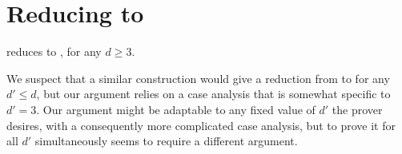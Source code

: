 \documentclass[11pt]{article}
\begin{document}
\appendix

\section{Reducing \CubicFormlong to \DFormlong} \label{app:cubic}

\begin{proposition} \label{prop:cubic_to_d}
\CubicFormlong reduces to \DFormlong, for any $d \geq 3$.
\end{proposition}

We suspect that a similar construction would give a reduction from 
 to \DFormlong for any $d' \leq d$, but our 
argument relies on a case analysis that is somewhat specific to $d'=3$. Our 
argument might be adaptable to any fixed value of $d'$ the prover desires, with a 
consequently more complicated case analysis, but to prove it for all $d'$ 
simultaneously seems to require a different argument.
\end{document}
